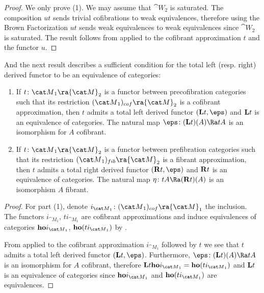 \begin{proof}
We only prove (1). We may assume that ${\cat W}_2$ is saturated. The composition $ut$ sends trivial cofibrations to weak equivalences, therefore using the Brown Factorization  $ut$ sends weak equivalences to weak equivalences since ${\cat W}_2$ is saturated. The result follows from  applied to the cofibrant approximation $t$ and the functor $u$.
\end{proof}

And the next result describes a sufficient condition for the total left (resp. right) derived functor to be an equivalence of categories:

\begin{thm}
\label{thm:existenceleftderivedequiv}
\mbox{}
\begin{enumerate}
\item
If $t \colon {\cat M}_1 \ra {\cat M}_2$ is a functor between precofibration categories such that its restriction $({\cat M}_1)_{cof} \ra {\cat M}_2$ is a cofibrant approximation, then $t$ admits a total left derived functor $({\bf L}t, \eps)$ and ${\bf L}t$ is an equivalence of categories. The natural map $\eps \colon ({\bf L}t)(A) \Ra tA$ is an isomorphism for $A$ cofibrant.
\item
If $t \colon {\cat M}_1 \ra {\cat M}_2$ is a functor between prefibration categories such that its restriction $({\cat M}_1)_{fib} \ra {\cat M}_2$ is a fibrant approximation, then $t$ admits a total right derived functor $({\bf R}t, \eps)$ and ${\bf R}t$ is an equivalence of categories. The natural map $\eta \colon tA \Ra ({\bf R}t)(A)$ is an isomorphism $A$ fibrant.
\end{enumerate}
\end{thm}

\begin{proof}
For part (1), denote $i_{{\cat M}_1} \colon ({\cat M}_1)_{cof} \ra {\cat M}_1$ the inclusion. The functors $i_{{\cat M}_1}$, $ti_{{\cat M}_1}$ are cofibrant approximations and induce equivalences of categories ${\bf ho}i_{{\cat M}_1}$, ${\bf ho}(ti_{{\cat M}_1})$ by . 

From  applied to the cofibrant approximation $i_{{\cat M}_1}$ followed by $t$ we see that $t$ admits a total left derived functor $({\bf L}t, \eps)$. Furthermore, $\eps \colon ({\bf L}t)(A) \Ra tA$ is an isomorphism for $A$ cofibrant, therefore ${\bf L}t {\bf ho}i_{{\cat M}_1} = {\bf ho}(ti_{{\cat M}_1})$ and ${\bf L}t$ is an equivalence of categories since ${\bf ho}i_{{\cat M}_1}$ and ${\bf ho}(ti_{{\cat M}_1})$ are equivalences.
\end{proof}

